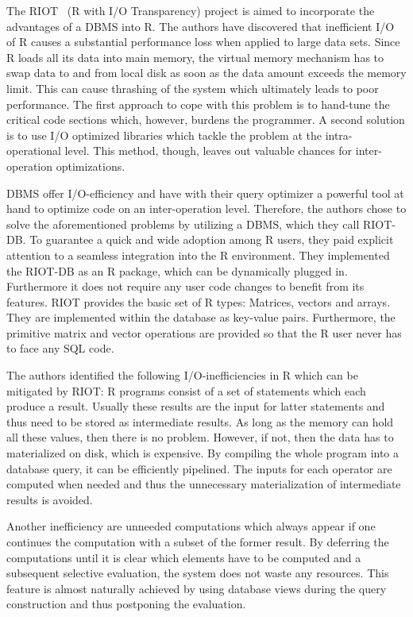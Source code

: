 The RIOT~\cite{zhang:apa2009a} (R with I/O Transparency) project is aimed to incorporate the advantages of a DBMS into R.
The authors \citeauthor{zhang:apa2009a} have discovered that inefficient I/O of R causes a substantial performance loss when applied to large data sets.
Since R loads all its data into main memory, the virtual memory mechanism has to swap data to and from local disk as soon as the data amount exceeds the memory limit.
This can cause thrashing of the system which ultimately leads to poor performance.
The first approach to cope with this problem is to hand-tune the critical code sections which, however, burdens the programmer.
A second solution is to use I/O optimized libraries which tackle the problem at the intra-operational level.
This method, though, leaves out valuable chances for inter-operation optimizations.

DBMS offer I/O-efficiency and have with their query optimizer a powerful tool at hand to optimize code on an inter-operation level.
Therefore, the authors chose to solve the aforementioned problems by utilizing a DBMS, which they call RIOT-DB.
To guarantee a quick and wide adoption among R users, they paid explicit attention to a seamless integration into the R environment.
They implemented the RIOT-DB as an R package, which can be dynamically plugged in.
Furthermore it does not require any user code changes to benefit from its features.
RIOT provides the basic set of R types: Matrices, vectors and arrays.
They are implemented within the database as key-value pairs.
Furthermore, the primitive matrix and vector operations are provided so that the R user never has to face any SQL code.

The authors identified the following I/O-inefficiencies in R which can be mitigated by RIOT:
R programs consist of a set of statements which each produce a result.
Usually these results are the input for latter statements and thus need to be stored as intermediate results.
As long as the memory can hold all these values, then there is no problem.
However, if not, then the data has to materialized on disk, which is expensive.
By compiling the whole program into a database query, it can be efficiently pipelined.
The inputs for each operator are computed when needed and thus the unnecessary materialization of intermediate results is avoided.

Another inefficiency are unneeded computations which always appear if one continues the computation with a subset of the former result.
By deferring the computations until it is clear which elements have to be computed and a subsequent selective evaluation, the system does not waste any resources.
This feature is almost naturally achieved by using database views during the query construction and thus postponing the evaluation.

